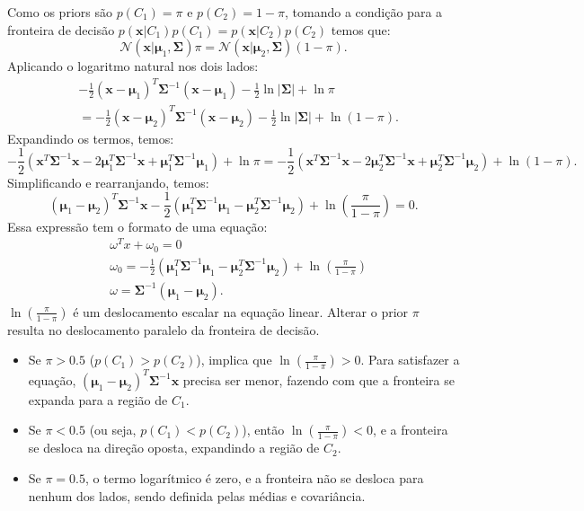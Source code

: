\documentclass[conference]{IEEEtran}
\begin{document}
Como os priors são $p(C_1) = \pi$ e $p(C_2) = 1 - \pi$, tomando a condição para a fronteira de decisão $p(\mathbf{x} | C_1) p(C_1) = p(\mathbf{x} | C_2) p(C_2)$ temos que:
\[
\mathcal{N}(\mathbf{x} | \boldsymbol{\mu}_1, \boldsymbol{\Sigma}) \pi = \mathcal{N}(\mathbf{x} | \boldsymbol{\mu}_2, \boldsymbol{\Sigma}) (1 - \pi).
\]
Aplicando o logaritmo natural nos dois lados:
\begin{align*}
& -\frac{1}{2} (\mathbf{x} - \boldsymbol{\mu}_1)^T \boldsymbol{\Sigma}^{-1} (\mathbf{x} - \boldsymbol{\mu}_1) - \frac{1}{2} \ln |\boldsymbol{\Sigma}| + \ln \pi \\
&= -\frac{1}{2} (\mathbf{x} - \boldsymbol{\mu}_2)^T \boldsymbol{\Sigma}^{-1} (\mathbf{x} - \boldsymbol{\mu}_2) - \frac{1}{2} \ln |\boldsymbol{\Sigma}| + \ln (1 - \pi).
\end{align*}
Expandindo os termos, temos:
\[
-\frac{1}{2} (\mathbf{x}^T \boldsymbol{\Sigma}^{-1} \mathbf{x} - 2 \boldsymbol{\mu}_1^T \boldsymbol{\Sigma}^{-1} \mathbf{x} + \boldsymbol{\mu}_1^T \boldsymbol{\Sigma}^{-1} \boldsymbol{\mu}_1) + \ln \pi = -\frac{1}{2} (\mathbf{x}^T \boldsymbol{\Sigma}^{-1} \mathbf{x} - 2 \boldsymbol{\mu}_2^T \boldsymbol{\Sigma}^{-1} \mathbf{x} + \boldsymbol{\mu}_2^T \boldsymbol{\Sigma}^{-1} \boldsymbol{\mu}_2) + \ln (1 - \pi).
\]
Simplificando e rearranjando, temos:
\[
(\boldsymbol{\mu}_1 - \boldsymbol{\mu}_2)^T \boldsymbol{\Sigma}^{-1} \mathbf{x} - \frac{1}{2} (\boldsymbol{\mu}_1^T \boldsymbol{\Sigma}^{-1} \boldsymbol{\mu}_1 - \boldsymbol{\mu}_2^T \boldsymbol{\Sigma}^{-1} \boldsymbol{\mu}_2) + \ln \left(\frac{\pi}{1 - \pi}\right) = 0.
\]
Essa expressão tem o formato de uma equação:
\begin{align*}
& \omega ^T x + \omega_0 = 0 \\
& \omega_0 = -\frac{1}{2} (\boldsymbol{\mu}_1^T \boldsymbol{\Sigma}^{-1} \boldsymbol{\mu}_1 - \boldsymbol{\mu}_2^T \boldsymbol{\Sigma}^{-1} \boldsymbol{\mu}_2) + \ln \left(\frac{\pi}{1 - \pi}\right)\\
& \omega = \boldsymbol{\Sigma}^{-1} (\boldsymbol{\mu}_1 - \boldsymbol{\mu}_2).
\end{align*}
$\ln \left(\frac{\pi}{1 - \pi}\right)$ é um deslocamento escalar na equação linear. Alterar o prior $\pi$ resulta no deslocamento paralelo da fronteira de decisão.
\begin{itemize}
    \item Se $\pi > 0.5$ ($p(C_1) > p(C_2)$), implica que $\ln \left(\frac{\pi}{1 - \pi}\right) > 0$. Para satisfazer a equação, $(\boldsymbol{\mu}_1 - \boldsymbol{\mu}_2)^T \boldsymbol{\Sigma}^{-1} \mathbf{x}$ precisa ser menor, fazendo com que a fronteira se expanda para a região de $C_1$.
    \item Se $\pi < 0.5$ (ou seja, $p(C_1) < p(C_2)$), então $\ln \left(\frac{\pi}{1 - \pi}\right) < 0$, e a fronteira se desloca na direção oposta, expandindo a região de $C_2$.
    \item Se $\pi = 0.5$, o termo logarítmico é zero, e a fronteira não se desloca para nenhum dos lados, sendo definida pelas médias e covariância.
\end{itemize}
\end{document}
